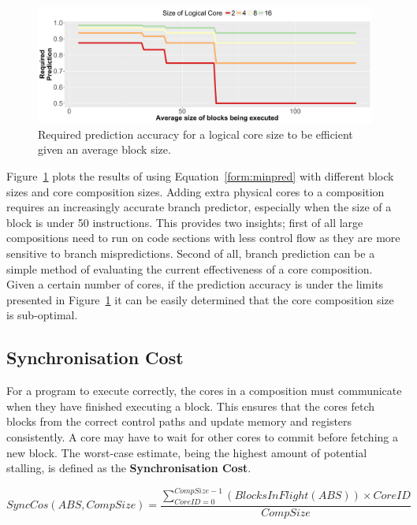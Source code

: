 \begin{figure}[t]
    \centering
    \includegraphics[width=\textwidth]{cases-paper/graphics/limit_study/prediction_req.pdf}
    \caption{Required prediction accuracy for a logical core size to be efficient given an average block size.}
    \label{fig:req_pred}
	\vspace{1em}
\end{figure}
Figure~\ref{fig:req_pred} plots the results of using Equation~\ref{form:minpred} with different block sizes and core composition sizes.
Adding extra physical cores to a composition requires an increasingly accurate branch predictor, especially when the size of a block is under 50 instructions.
This provides two insights; first of all large compositions need to run on code sections with less control flow as they are more sensitive to branch mispredictions.
Second of all, branch prediction can be a simple method of evaluating the current effectiveness of a core composition.
Given a certain number of cores, if the prediction accuracy is under the limits presented in Figure~\ref{fig:req_pred} it can be easily determined that the core composition size is sub-optimal.

\subsection{Synchronisation Cost}

For a program to execute correctly, the cores in a composition must communicate when they have finished executing a block.
This ensures that the cores fetch blocks from the correct control paths and update memory and registers consistently.
A core may have to wait for other cores to commit before fetching a new block. 
The worst-case estimate, being the highest amount of potential stalling, is defined as the \textbf{Synchronisation Cost}.

\begin{equation}\label{form:synccost}
SyncCos(ABS,CompSize) = \frac{\sum_{CoreID=0}^{CompSize-1}\left(BlocksInFlight(ABS)\right) \times CoreID }{CompSize}
\end{equation}



